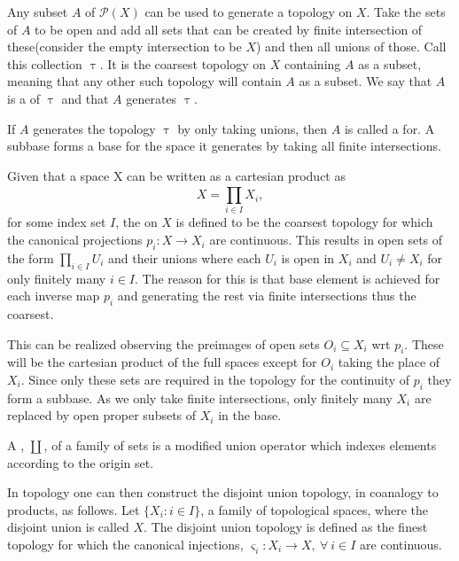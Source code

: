 \documentclass[../../main.tex]{subfiles}
\begin{document}
    Any subset $A$ of $\mathcal{P}(X)$ can be used to generate a topology on $X$. Take the sets of $A$ to be open and add all sets that can be created by finite intersection of these(consider the empty intersection to be $X$) and then all unions of those. Call this collection $\uptau$. It is the coarsest topology on $X$ containing $A$ as a subset, meaning that any other such topology will contain $A$ as a subset. We say that $A$ is a  of $\uptau$ and that $A$ generates $\uptau$. 
    
    If $A$ generates the topology $\uptau$ by only taking unions, then $A$ is called a  for. A subbase forms a base for the space it generates by taking all finite intersections.
    
    \begin{definition}
        Given that a space X can be written as a cartesian product as $$X=\prod_{i\in I}^{}X_i,$$ for some index set $I$, the  on $X$ is defined to be the coarsest topology for which the canonical projections $p_i:X\to X_i$ are continuous. This results in open sets of the form $ \prod_{i\in I}U_i$ and their unions where each $U_i$ is open in $X_i$ and $U_i \ne X_i$ for only finitely many $i\in I$. The reason for this is that  base element is achieved for each inverse map $p_i$ and generating the rest via finite intersections thus the coarsest.
    \end{definition}
    This can be realized observing the preimages of open sets $O_i \subseteq X_i$ wrt $p_i$. These will be the cartesian product of the full spaces except for $O_i$ taking the place of $X_i$. Since only these sets are required in the topology for the continuity of $p_i$ they form a subbase. As we only take finite intersections, only finitely many $X_i$ are replaced by open proper subsets of $X_i$ in the base.
    
    \begin{definition}
        A , $\coprod$, of a family of sets is a modified union operator which indexes elements according to the origin set. 
    \end{definition}
    
    In topology one can then construct the disjoint union topology, in coanalogy to products, as follows. Let $\{X_i : i \in I\}$, a family of topological spaces, where the disjoint union is called $X$. The disjoint union topology is defined as the finest topology for which the canonical injections, $\varsigma_i :X_i\to X, \: \forall\: i \in I$ are continuous.
    
\end{document}
